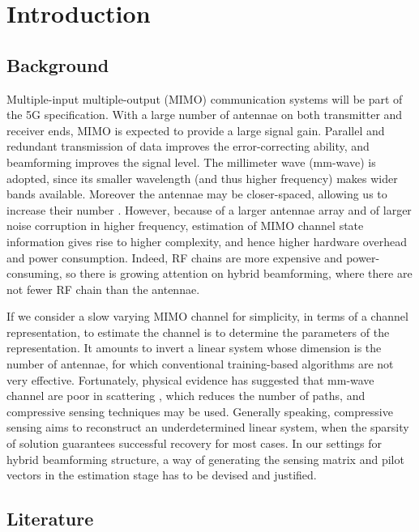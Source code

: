 \documentclass[journal]{IEEEtran}
\begin{document}
\section{Introduction}

\subsection {Background}

Multiple-input multiple-output (MIMO) communication systems will be part of the 5G specification.
With a large number of antennae on both transmitter and receiver ends, MIMO is expected to provide a large signal gain.
Parallel and redundant transmission of data improves the error-correcting ability, and beamforming improves the signal level.
The millimeter wave (mm-wave) is adopted, since its smaller wavelength (and thus higher frequency) makes wider bands available.
Moreover the antennae may be closer-spaced, allowing us to increase their number \cite {RSM13}.
However, because of a larger antennae array and of larger noise corruption in higher frequency, estimation of MIMO channel state information gives rise to higher complexity, and hence higher hardware overhead and power consumption.
Indeed, RF chains are more expensive and power-consuming, so there is growing attention on hybrid beamforming, where there are not fewer RF chain than the antennae.

If we consider a slow varying MIMO channel for simplicity, in terms of a channel representation, to estimate the channel is to determine the parameters of the representation.
It amounts to invert a linear system whose dimension is the number of antennae, for which conventional training-based algorithms are not very effective.
Fortunately, physical evidence has suggested that mm-wave channel are poor in scattering \cite {ALS14}, which reduces the number of paths, and compressive sensing techniques may be used.
Generally speaking, compressive sensing aims to reconstruct an underdetermined linear system, when the sparsity of solution guarantees successful recovery for most cases.
In our settings for hybrid beamforming structure, a way of generating the sensing matrix and pilot vectors in the estimation stage has to be devised and justified.

\subsection {Literature}
\end{document}
